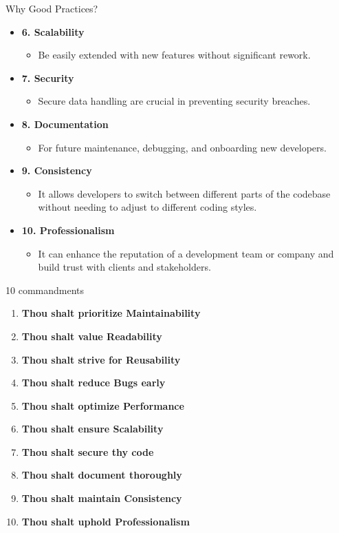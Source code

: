 \documentclass[10pt]{beamer}
\begin{document}
\begin{frame}{Why Good Practices?}
  \begin{itemize}
    \item \textbf{6. Scalability}
    \begin{itemize}
      \item Be easily extended with new features without significant rework.
    \end{itemize}
    \item \textbf{7. Security}
    \begin{itemize}
      \item Secure data handling are crucial in preventing security breaches.
    \end{itemize}
    \item \textbf{8. Documentation}
    \begin{itemize}
      \item For future maintenance, debugging, and onboarding new developers.
    \end{itemize}
    \item \textbf{9. Consistency}
    \begin{itemize}
      \item It allows developers to switch between different parts of the codebase without needing to adjust to different coding styles.
    \end{itemize}
    \item \textbf{10. Professionalism}
    \begin{itemize}
      \item It can enhance the reputation of a development team or company and build trust with clients and stakeholders.
    \end{itemize}
  \end{itemize}
\end{frame}


\begin{frame}{10 commandments}
  \begin{enumerate}
    \item \textbf{Thou shalt prioritize Maintainability}
    \item \textbf{Thou shalt value Readability}
    \item \textbf{Thou shalt strive for Reusability}
    \item \textbf{Thou shalt reduce Bugs early}
    \item \textbf{Thou shalt optimize Performance}
    \item \textbf{Thou shalt ensure Scalability}
    \item \textbf{Thou shalt secure thy code}
    \item \textbf{Thou shalt document thoroughly}
    \item \textbf{Thou shalt maintain Consistency}
    \item \textbf{Thou shalt uphold Professionalism}
  \end{enumerate}
\end{frame}
\end{document}
